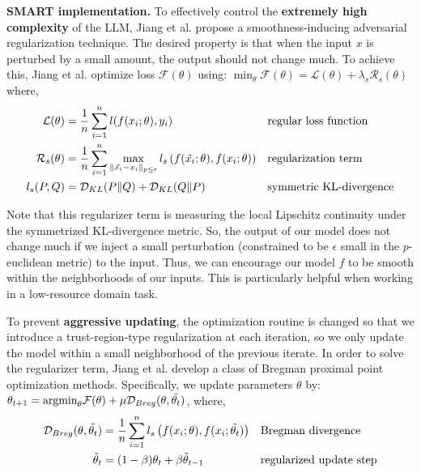 \documentclass{article}
\begin{document}
\textbf{SMART implementation.} To effectively control the \textbf{extremely high complexity} of the LLM, Jiang et al. \cite{smart} propose a smoothness-inducing adversarial regularization technique. The desired property is that when the input $x$ is perturbed by a small amount, the output should not change much. To achieve this, Jiang et al. \cite{smart} optimize loss $\mathcal{F}(\theta)$ using: $\min_{\theta} \mathcal{F}(\theta) = \mathcal{L}(\theta) + \lambda_{s}\mathcal{R}_{s}(\theta)$ where,
\begin{align*}
\mathcal{L}(\theta) & = \frac{1}{n} \sum_{i=1}^{n} l(f(x_{i};\theta), y_{i}) && \text{regular loss function} \\
\mathcal{R}_{s}(\theta) & = \frac{1}{n} \sum_{i=1}^{n} \max_{\lVert \Tilde{x_{i}} - x_{i} \rVert_{p \leq \epsilon}} l_{s}\left(f(\Tilde{x_{i}}; \theta), f(x_{i}; \theta)\right) && \text{regularization term}\\
l_{s}(P, Q) & = \mathcal{D}_{KL}(P \lVert Q) + \mathcal{D}_{KL}(Q \lVert P) && \text{symmetric KL-divergence}
\end{align*} 

Note that this regularizer term is measuring the local Lipschitz continuity under the symmetrized KL-divergence metric. So, the output of our model does not change much if we inject a small perturbation (constrained to be $\epsilon$ small in the $p$-euclidean metric) to the input. Thus, we can encourage our model $f$ to be smooth within the neighborhoods of our inputs. This is particularly helpful when working in a low-resource domain task. 

To prevent \textbf{aggressive updating}, the optimization routine is changed so that we introduce a trust-region-type regularization at each iteration, so we only update the model within a small neighborhood of the previous iterate. In order to solve the regularizer term, Jiang et al. \cite{smart} develop a class of Bregman proximal point optimization methods. Specifically, we update parameters $\theta$ by: $\theta_{t+1} = \text{argmin}_{\theta} \mathcal{F}(\theta) + \mu \mathcal{D}_{Breg}(\theta, \Tilde{\theta_{t}})$, where,
\begin{align*}
\mathcal{D}_{Breg}(\theta, \Tilde{\theta_{t}}) & = \frac{1}{n} \sum_{i=1}^{n} l_{s} \left( f(x_{i}; \theta), f(x_{i}; \Tilde{\theta_{t}}) \right) && \text{Bregman divergence} \\
\Tilde{\theta}_{t} & = (1 - \beta)\theta_{t} + \beta \Tilde{\theta}_{t-1} && \text{regularized update step}
\end{align*}
\end{document}
